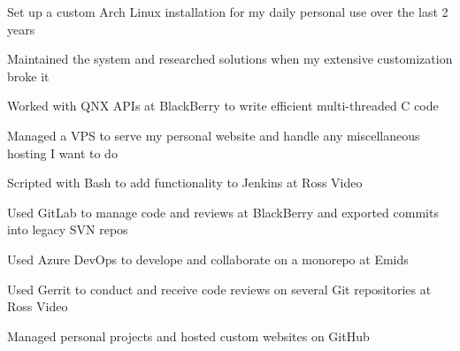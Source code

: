 \begin{bullets}
    \item Set up a custom Arch Linux installation for my daily personal use over the last 2 years
    \item Maintained the system and researched solutions when my extensive customization broke it
    \item Worked with QNX APIs at BlackBerry to write efficient multi-threaded C code
    \item Managed a VPS to serve my personal website and handle any miscellaneous hosting I want to do
    \item Scripted with Bash to add functionality to Jenkins at Ross Video
\end{bullets}

\begin{bullets}
	\item Used GitLab to manage code and reviews at BlackBerry and exported commits into legacy SVN repos
    \item Used Azure DevOps to develope and collaborate on a monorepo at Emids
    \item Used Gerrit to conduct and receive code reviews on several Git repositories at Ross Video
    \item Managed personal projects and hosted custom websites on GitHub
\end{bullets}
